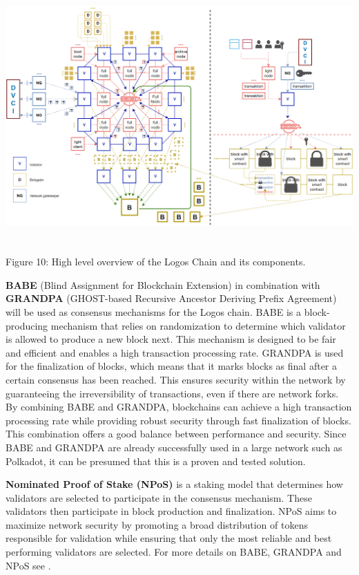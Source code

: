 \documentclass[]{article}
\begin{document}
\begin{center}
	\includegraphics[height=9.7cm]{logos-chain}
\end{center}
\begin{center}
	Figure 10: High level overview of the Logos Chain and its components.
\end{center}

\textbf{BABE} (Blind Assignment for Blockchain Extension) \cite{Parity-docs-babe} in combination with \textbf{GRANDPA} (GHOST-based Recursive Ancestor Deriving Prefix Agreement) \cite{Parity-docs-grandpa} will be used as consensus mechanisms for the Logos chain. 
BABE is a block-producing mechanism that relies on randomization to determine which validator is allowed to produce a new block next. This mechanism is designed to be fair and efficient and enables a high transaction processing rate.
GRANDPA is used for the finalization of blocks, which means that it marks blocks as final after a certain consensus has been reached. This ensures security within the network by guaranteeing the irreversibility of transactions, even if there are network forks.
By combining BABE and GRANDPA, blockchains can achieve a high transaction processing rate while providing robust security through fast finalization of blocks.
This combination offers a good balance between performance and security.
Since BABE and GRANDPA are already successfully used in a large network such as Polkadot, it can be presumed that this is a proven and tested solution.

\textbf{Nominated Proof of Stake (NPoS)} \cite{Parity-docs-npos} is a staking model that determines how validators are selected to participate in the consensus mechanism.
These validators then participate in block production and finalization. 
NPoS aims to maximize network security by promoting a broad distribution of tokens responsible for validation while ensuring that only the most reliable and best performing validators are selected.
For more details on BABE, GRANDPA and NPoS see \cite{SubstrateDoc-consensus}.
\end{document}
